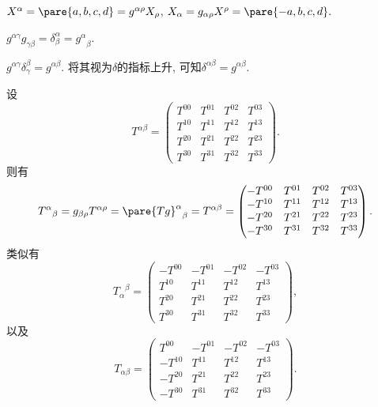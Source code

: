 \documentclass[hidelinks]{ctexart}
\begin{document}
\begin{ex}
    $X^\alpha = \pare{a,b,c,d} = g^{\alpha\rho}X_\rho$, $X_\alpha = g_{\alpha\rho}X^\rho = \pare{-a,b,c,d}.$
\end{ex}
\begin{ex}
    $g^{\alpha\gamma}g_{\gamma\beta} = \delta^\alpha_\beta = {g^\alpha}_\beta$.
\end{ex}
\begin{ex}
    $g^{\alpha\gamma} \delta^\beta_\gamma = g^{\alpha\beta}$. 将其视为$\delta$的指标上升, 可知$\delta^{\alpha\beta} = g^{\alpha\beta}$.
\end{ex}
\begin{ex}
    设
    \[ T^{\alpha\beta} = \begin{pmatrix}
        T^{00} & T^{01} & T^{02} & T^{03} \\
        T^{10} & T^{11} & T^{12} & T^{13} \\
        T^{20} & T^{21} & T^{22} & T^{23} \\
        T^{30} & T^{31} & T^{32} & T^{33}
    \end{pmatrix}. \]
    则有
    \[ {T^\alpha}_\beta = g_{\beta\rho}T^{\alpha\rho} = {\pare{Tg}^\alpha}_\beta = T^{\alpha\beta} = \begin{pmatrix}
        -T^{00} & T^{01} & T^{02} & T^{03} \\
        -T^{10} & T^{11} & T^{12} & T^{13} \\
        -T^{20} & T^{21} & T^{22} & T^{23} \\
        -T^{30} & T^{31} & T^{32} & T^{33}
    \end{pmatrix}. \]
    类似有
    \[ {T_\alpha}^\beta = \begin{pmatrix}
        -T^{00} & -T^{01} & -T^{02} & -T^{03} \\
        T^{10} & T^{11} & T^{12} & T^{13} \\
        T^{20} & T^{21} & T^{22} & T^{23} \\
        T^{30} & T^{31} & T^{32} & T^{33}
    \end{pmatrix}, \]
    以及
    \[ {T_{\alpha\beta}} = \begin{pmatrix}
        T^{00} & -T^{01} & -T^{02} & -T^{03} \\
        -T^{10} & T^{11} & T^{12} & T^{13} \\
        -T^{20} & T^{21} & T^{22} & T^{23} \\
        -T^{30} & T^{31} & T^{32} & T^{33}
    \end{pmatrix}. \]
\end{ex}
\end{document}
